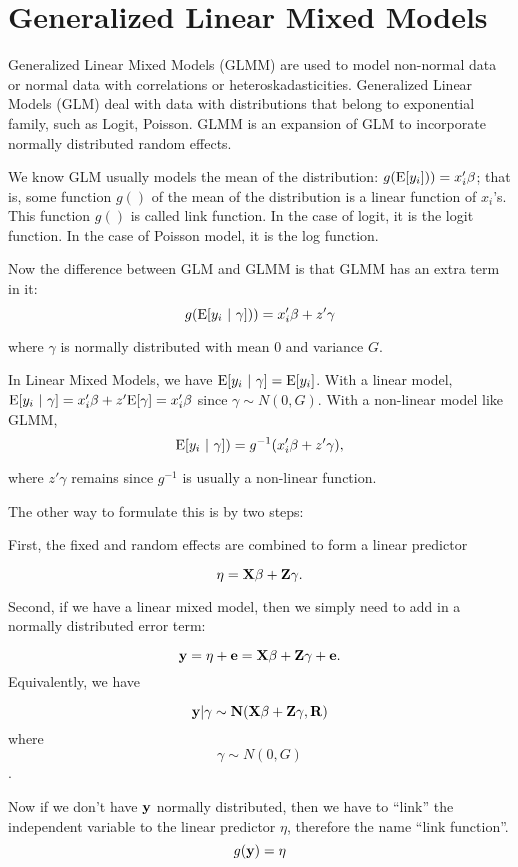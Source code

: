 \section{Generalized Linear Mixed Models}

Generalized Linear Mixed Models (GLMM) are used to model non-normal
data or normal data with correlations or heteroskadasticities.
Generalized Linear Models (GLM) deal with data with distributions that
belong to exponential family, such as Logit, Poisson.  GLMM is an
expansion of GLM to incorporate normally distributed random effects.

We know GLM usually models the mean of the distribution: $g({\rm E}
[y_i])) =x'_i \beta$; that is, some function $g()$ of the mean of the
distribution is a linear function of $x_i$'s.  This function $g()$ is
called link function.  In the case of logit, it is the logit function.
In the case of Poisson model, it is the log function.

Now the difference between GLM and GLMM is that GLMM has an extra term in it:
\[ g({\rm E}[y_i \ | \ \gamma])) =x'_i \beta + z' \gamma \]

where $\gamma$ is normally distributed with mean $0$ and variance $G$.  

In Linear Mixed Models, we have $ {\rm E}[y_i \ | \ \gamma] = {\rm E}[y_i]$.  With a linear model,
${\rm E}[y_i \ | \ \gamma] = x'_i \beta + z' {\rm E} [\gamma] = x'_i \beta $ since $ \gamma \sim  N(0, G)$.  With a non-linear model like GLMM, 
\[ {\rm E}[y_i \ | \ \gamma]) = g^{-1} (x'_i \beta + z' \gamma), \]

where $z' \gamma$ remains since $g^{-1}$ is usually a non-linear function.

The other way to formulate this is by two steps:

First, the fixed and random effects are combined to form a linear predictor

\[ \bf \eta = X \beta + Z \gamma . \]

Second, if we have a linear mixed model, then we simply need to add in a normally distributed error term: 

\[ \bf y= \eta + e = X \beta + Z \gamma + e . \]
Equivalently, we have

\[\bf y |  \gamma \sim  N(X \beta + Z \gamma, R) \]
where \[ \gamma \sim  N(0, G)\].

Now if we don't have $\bf y$ normally distributed, then we have to
 ``link'' the independent variable to the linear predictor $\eta$, therefore the name ``link function''.  
\[ g( \bf y)= \eta \]

